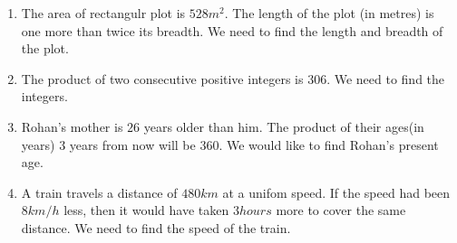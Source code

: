 \begin{enumerate}[label=\thesubsection.\arabic*,ref=\thesubsection.\theenumi,resume*]
\item The area of rectangulr plot is $528m^2$. The length of the plot (in metres) is one more than twice its breadth. We need to find the length and breadth of the plot.
\item The product of two consecutive positive integers is $306$. We need to find the integers.
\item Rohan's mother is $26$ years older than him. The product of their ages(in years) $3$ years from now will be $360$. We would like to find Rohan's present age.
\item A train travels a distance of $480km$ at a unifom speed. If the speed had been $8km/h$ less, then it would have taken $3 hours$ more to cover the same distance. We need to find the speed of the train.
\end{enumerate}
